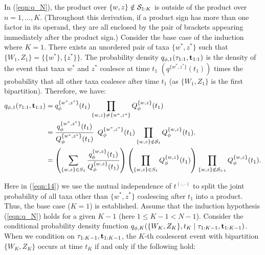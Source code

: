 \begin{doublespace}
In (\ref{eqn:q_N}), the product over $\{w,z\} \notin \mathcal{S}_{1:K}$ is outside of the product over $n=1,\ldots,K$. (Throughout this derivation, if a product sign has more than one factor in its operand, they are all enclosed by the pair of brackets appearing immediately after the product sign.) Consider the base case of the induction where $K = 1$. There exists an unordered pair of taxa $\{w^*, z^*\}$ such that  $\{W_1,Z_1\} = \{\{w^*\},\{z^*\}\}$. The probability density $q_{\phi,1}(\tau_{1:1},\mathbf{t}_{1:1})$ is the density of the event that taxa $w^*$ and $z^*$ coalesce at time $t_1$ $(q^{\{w^*,z^*\}}(t_1))$ times the probability that all other taxa coalesce after time $t_1$ (as $\{W_1,Z_1\}$ is the first bipartition). Therefore, we have:
\begin{align}
    q_{\phi,1}(\tau_{1:1},\mathbf{t}_{1:1}) &= q_\phi^{\{w^*,z^*\}}(t_1) \prod_{\{w,z\} \neq \{w^*,z^*\}} Q_\phi^{\{w,z\}}(t_1) \label{eqn:14} \\
    &= \frac{q_\phi^{\{w^*,z^*\}}(t_1)}{Q_\phi^{\{w^*,z^*\}}(t_1)} \enspace Q_\phi^{\{w^*,z^*\}}(t_1) \prod_{\{w,z\} \notin \mathcal{S}_1} Q_\phi^{\{w,z\}}(t_1). \\
    &= \left(\sum_{\{w,z\} \in S_1} \frac{q_\phi^{\{w,z\}}(t_1)}{Q_\phi^{\{w,z\}}(t_1)}\right)\left(\prod_{\{w,z\} \in S_1} Q_\phi^{\{w,z\}}(t_1)\right)\prod_{\{w,z\} \notin \mathcal{S}_{1:1}} Q_\phi^{\{w,z\}}(t_1).
\end{align}

Here in (\ref{eqn:14}) we use the mutual independence of $t^{(\cdot,\cdot)}$ to split the joint probability of all taxa other than $\{w^*,z^*\}$ coalescing after $t_1$ into a product. Thus, the base case ($K=1$) is established. Assume that the induction hypothesis (\ref{eqn:q_N}) holds for a given $K-1$ (here $1 \le K - 1 < N - 1$). Consider the conditional probability density function $q_{\phi,K}(\{W_K,Z_K\},t_K\mid \tau_{1:K-1},\mathbf{t}_{1:K-1})$. When we condition on $\tau_{1:K-1},\mathbf{t}_{1:K-1}$, the $K$-th coalescent event with bipartition $\{W_{K},Z_{K}\}$ occurs at time $t_{K}$ if and only if the following hold:


\end{doublespace}

